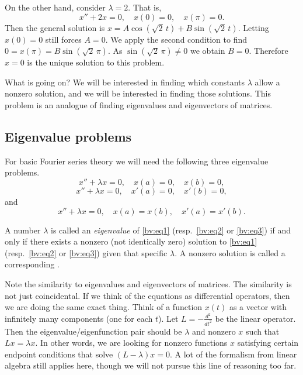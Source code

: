 \documentclass{ximera}
\begin{document}
\begin{example}
    On the other hand, consider $\lambda = 2$.  That is,
    \begin{equation*}
        x'' + 2 x = 0, \quad x(0) = 0, \quad x(\pi) = 0.
    \end{equation*}
    Then the general solution is $x= A \cos ( \sqrt{2}\,t) + B \sin ( \sqrt{2}\,t)$.  Letting $x(0) = 0$ still forces $A = 0$.  We apply the second condition to find $0=x(\pi) = B \sin ( \sqrt{2}\,\pi)$. As $\sin ( \sqrt{2}\,\pi) \not= 0$ we obtain $B = 0$.  Therefore $x=0$ is the unique solution to this problem.
\end{example}

What is going on?  We will be interested in finding which constants $\lambda$ allow a nonzero solution, and we will be interested in finding those solutions.  This problem is an analogue of finding eigenvalues and eigenvectors of matrices.  

\subsection{Eigenvalue problems}

For basic Fourier series theory we will need the following three eigenvalue problems.
\begin{equation} \label{bv:eq1}
    x'' + \lambda x = 0, \quad x(a) = 0, \quad x(b) = 0 ,
\end{equation}
\begin{equation} \label{bv:eq2}
    x'' + \lambda x = 0, \quad x'(a) = 0, \quad x'(b) = 0 ,
\end{equation}
and
\begin{equation} \label{bv:eq3}
    x'' + \lambda x = 0, \quad x(a) = x(b), \quad x'(a) = x'(b) .
\end{equation}
\begin{definition} 
    A number $\lambda$ is called an \emph{eigenvalue} of \eqref{bv:eq1} (resp.\ \eqref{bv:eq2} or \eqref{bv:eq3}) if and only if there exists a nonzero (not identically zero) solution to \eqref{bv:eq1} (resp.\ \eqref{bv:eq2} or \eqref{bv:eq3}) given that specific $\lambda$.  A nonzero solution is called a corresponding \emph{}.
\end{definition}

Note the similarity to eigenvalues and eigenvectors of matrices.  The similarity is not just coincidental.  If we think of the equations as differential operators, then we are doing the same exact thing. Think of a function $x(t)$ as a vector with infinitely many components (one for each $t$). Let $L = -\frac{d^2}{{dt}^2}$ be the linear operator. Then the eigenvalue/eigenfunction pair should be $\lambda$ and nonzero $x$ such that $Lx = \lambda x$. In other words, we are looking for nonzero functions $x$ satisfying certain endpoint conditions that solve $(L- \lambda)x = 0$.  A lot of the formalism from linear algebra still applies here, though we will not pursue this line of reasoning too far.
\end{document}
